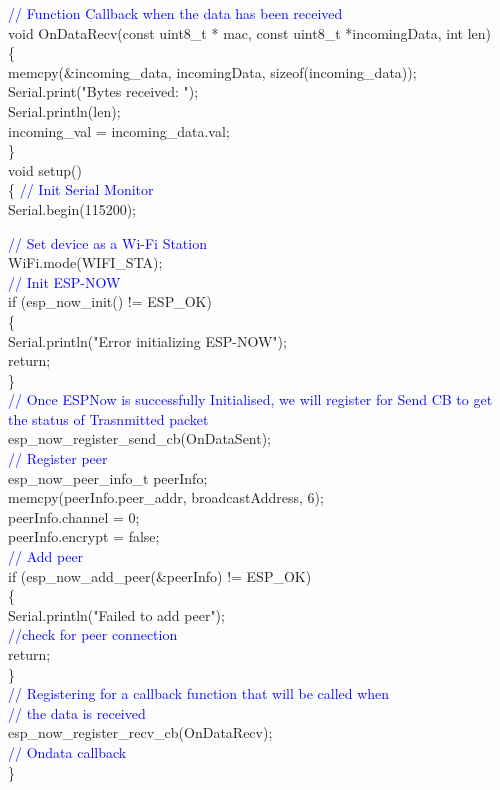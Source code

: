 \documentclass[12pt,a4paper]{article}
\begin{document}
\textcolor{blue}{// Function Callback when the data has been received}\\
void OnDataRecv(const uint8\_t * mac, const uint8\_t *incomingData, int len)\\
\{\\

  memcpy(\&incoming\_data, incomingData, sizeof(incoming\_data));\\
  Serial.print("Bytes received: ");\\
  Serial.println(len);\\
  incoming\_val = incoming\_data.val;\\
\}\\[15pt]
 
void setup()\\
\{
  \textcolor{blue}{// Init Serial Monitor}\\
  Serial.begin(115200);

  \textcolor{blue}{// Set device as a Wi-Fi Station}\\
  WiFi.mode(WIFI\_STA);\\

  \textcolor{blue}{// Init ESP-NOW}\\
  if (esp\_now\_init() != ESP\_OK)\\
  \{\\
    Serial.println("Error initializing ESP-NOW");\\
    return;\\
  \}\\
  \textcolor{blue}{// Once ESPNow is successfully Initialised, we will register for Send CB to get the status of Trasnmitted packet}\\
  esp\_now\_register\_send\_cb(OnDataSent);\\
  \textcolor{blue}{// Register peer}\\
  esp\_now\_peer\_info\_t peerInfo;\\
  memcpy(peerInfo.peer\_addr, broadcastAddress, 6);\\
  peerInfo.channel = 0; \\
  peerInfo.encrypt = false;\\
  \textcolor{blue}{// Add peer}\\      
  if (esp\_now\_add\_peer(\&peerInfo) != ESP\_OK)\\
  \{\\ 
    Serial.println("Failed to add peer");\\
    \textcolor{blue}{//check for peer connection}\\
    return;\\
  \}\\
  \textcolor{blue}{// Registering for a callback function that will be called when \\// the data is received}\\
  esp\_now\_register\_recv\_cb(OnDataRecv);\\\textcolor{blue}{// Ondata callback}\\
\}\\[15pt]
 
\end{document}
